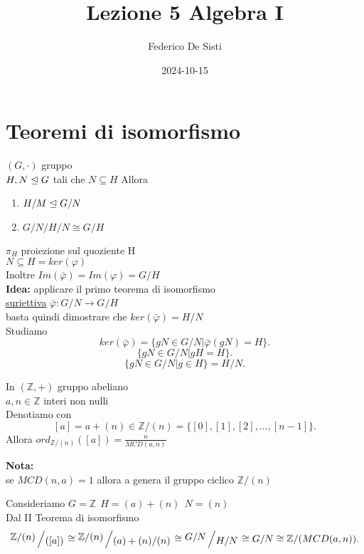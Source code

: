 \documentclass[12px]{article}
\title{Lezione 5 Algebra I}
\date{2024-10-15}
\author{Federico De Sisti}
\begin{document}
	\maketitle
	\newpage
	\section{Teoremi di isomorfismo}
	\begin{teo}
		$(G,\cdot)$ gruppo\\
		$H,N\trianglelefteq G$ tali che $N\subseteq H$ Allora
		 \begin{enumerate}
			 \item$ H/M\trianglelefteq G/N $
			 \item $G/N/H/N \cong G/H$
		 \end{enumerate}
	\end{teo}
	\begin{dimo}
$\pi_H$ proiezione sul quoziente H\\
$N\subseteq H = ker ( \varphi)$ \\
Inoltre $Im( \bar\varphi) = Im( \varphi) = G/H$\\
\textbf{Idea:} applicare il primo teorema di isomorfismo\\
\underline{suriettiva} $\bar \varphi: G/N \rightarrow G/H$\\
basta quindi dimostrare che $ker (\bar \varphi) = H/N$\\
Studiamo
\[
ker(\bar \varphi) = \lbrace gN\in G/N | \bar \varphi(gN) = H\rbrace
.\] 
\[
	\{gN\in G/N | gH = H\}
.\] 
\[
	\{gN\in G/N | g\in H\} = H/N
.\] 
	\end{dimo}
	\begin{coro}
		In $(\mathbb Z, +)$ gruppo abeliano\\$a,n\in \mathbb Z$ interi non nulli\\
		Denotiamo con
		\[
			[a] = a + (n) \in \mathbb Z/(n) = \{ [0],[1],[2],\ldots,[n-1]\}
		.\] 
		Allora $ord_{\mathbb Z/(n)}([a]) = \frac n {MCD(a,n)}$
	\end{coro}
	\textbf{Nota:}\\
	se $MCD(n,a) = 1$ allora a genera il gruppo ciclico  $\mathbb Z/(n)$
	 \begin{dimo}
		Consideriamo $G=\mathbb Z \ \ H = (a) + (n) \ \ N= (n)$\\
		Dal II Teorema di isomorfismo
		 \[
			 \bigslant{\mathbb Z/(n)}{([a])
			 }\cong\bigslant{\mathbb Z/(n)}{(a) + (n)/(n)} \cong \bigslant {G/N}{H/N}\cong G/N \cong \mathbb Z/(MCD(a,n))
		.\] 
	\end{dimo}
\end{document}

